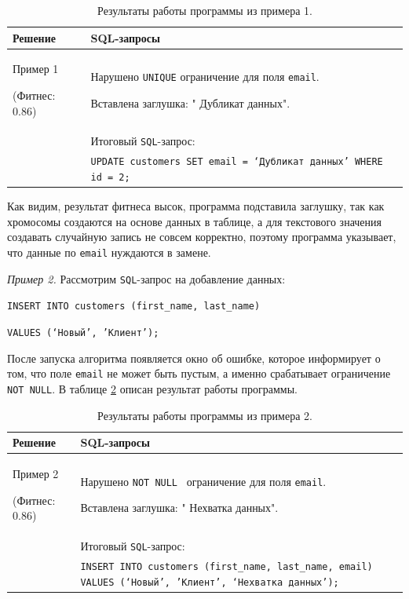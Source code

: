 \documentclass[master,paper]{pmk-graduate}
\begin{document}
\begin{table}
	\centering
	\begin{tabularx}{\linewidth}{@{}>{\hsize=0.5\hsize}X>{\hsize=1.5\hsize}X@{}}
		\toprule
		\textbf{Решение} & \textbf{SQL-запросы} \\
		\midrule
		Пример 1 
		
		(Фитнес: 0.86) & 
		Нарушено \texttt{UNIQUE} ограничение для поля \texttt{email}.
		
		Вставлена заглушка: " Дубликат данных".\\
		& Итоговый \texttt{SQL}-запрос: \\
		& \texttt{UPDATE customers SET email = ‘Дубликат данных' WHERE id = 2;} \\
		\bottomrule
	\end{tabularx}
	\caption{Результаты работы программы из примера 1.}
	\label{table1}
\end{table}

Как видим, результат фитнеса высок, программа подставила заглушку, так как хромосомы создаются на основе данных в таблице, а для текстового значения создавать случайную запись не совсем корректно, поэтому программа указывает, что данные по \texttt{email} нуждаются в замене.

\textit{Пример 2.} Рассмотрим \texttt{SQL}-запрос на добавление данных:

\texttt{INSERT INTO customers (first\_name, last\_name)} 

\texttt{VALUES (‘Новый’, ’Клиент’);}

После запуска алгоритма появляется окно об ошибке, которое информирует о том, что поле \texttt{email} не может быть пустым, а именно срабатывает ограничение \texttt{NOT NULL}. В таблице \ref{table2} описан результат работы программы.

\begin{table}
	\centering
	\begin{tabularx}{\linewidth}{@{}>{\hsize=0.5\hsize}X>{\hsize=1.5\hsize}X@{}}
		\toprule
		\textbf{Решение} & \textbf{SQL-запросы} \\
		\midrule
		Пример 2 
		
		(Фитнес: 0.86) & 
		Нарушено \texttt{NOT NULL } ограничение для поля \texttt{email}.
		
		Вставлена заглушка: " Нехватка данных".\\
		& Итоговый \texttt{SQL}-запрос: \\
		& \texttt{INSERT INTO customers (first\_name, last\_name, email) VALUES (‘Новый’, ’Клиент’, ‘Нехватка данных’);} \\
		\bottomrule
	\end{tabularx}
	\caption{Результаты работы программы из примера 2.}
	\label{table2}
\end{table}
\end{document}
